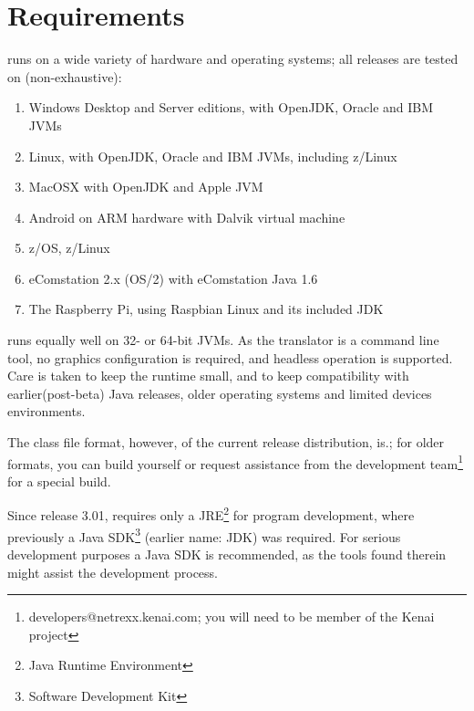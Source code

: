 \chapter{Requirements}
\nr{} \nrversion{} runs on a wide variety of
hardware and operating systems; all releases are tested on (non-exhaustive):
\begin{enumerate}
\item Windows Desktop and Server editions, with OpenJDK, Oracle and IBM JVMs
\item Linux, with OpenJDK, Oracle and IBM JVMs, including z/Linux
\item MacOSX with OpenJDK and Apple JVM
\item Android on ARM hardware with Dalvik virtual machine
\item z/OS, z/Linux
\item eComstation 2.x (OS/2) with eComstation Java 1.6
\item The Raspberry Pi, using Raspbian Linux and its included JDK
\end{enumerate}
\nr{} runs equally well on 32- or 64-bit JVMs. As the translator is
a command line tool, no graphics configuration is required, and
headless operation is supported. Care is taken to keep the \nr{} runtime small, and to keep
compatibility with earlier(post-beta) Java releases, older operating systems and
limited devices environments. 

The class file format, however, of the current release distribution, is.; for older formats, you
can build \nr{} yourself or request assistance from the development
team\footnote{developers@netrexx.kenai.com; you will
  need to be member of the Kenai \nr{} project} for a special build.
\begin{shaded}\noindent
Since release 3.01, \nr{} requires only a
JRE\footnote{Java Runtime Environment} for program development, where previously a
Java SDK\footnote{Software Development Kit} (earlier name: JDK) was required. For serious development
purposes a Java SDK is recommended, as the tools found therein might
assist the development process.
\end{shaded}\indent